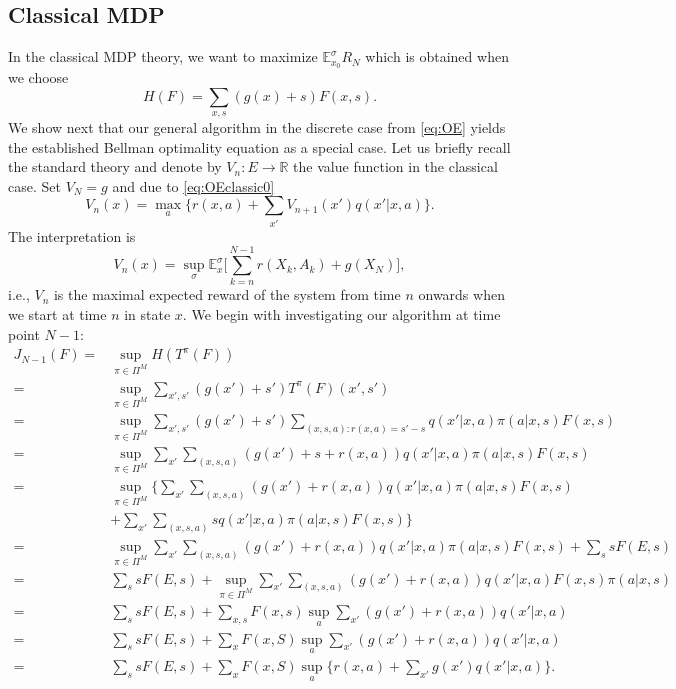 \documentclass[reqno, 12pt]{amsart}%
\newcommand{\R}{\mathbb{R}} %
\newcommand{\EE}{\mathbb{E}}
\theoremstyle{definition}
\numberwithin{equation}{section} \numberwithin{theorem}{section}
\begin{document}
\subsection{Classical MDP}
In the classical MDP theory, we want to maximize $\EE_{x_0}^\sigma R_N$ which is obtained when we choose $$H(F)=\sum_{x,s} (g(x)+s) F(x,s).$$
We show next that our general algorithm in the discrete case from \eqref{eq:OE} yields the established Bellman optimality equation as a special case. Let us briefly recall the standard theory and denote by $V_n : E\to \R$ the value function in the classical case.  Set $V_N=g$ and due to \eqref{eq:OEclassic0}
\begin{equation}\label{eq:OEclassic}
    V_n(x)= \max_a \big\{r(x,a) + \sum_{x'} 
    V_{n+1}(x')q(x'|x,a) \big\}.
\end{equation} 
The interpretation is 
$$V_n(x) = \sup_\sigma \EE_x^\sigma\Big[\sum_{k=n}^{N-1}r(X_k,A_k) + g(X_N)\Big],$$
i.e., $V_n$ is the maximal expected reward of 
the system from time $n$ onwards when we start 
at time $n$ in state $x.$ We begin with 
investigating our algorithm at time point 
$N-1:$
 \begin{align*}
J_{N-1}(F)  =& \sup_{\pi\in \Pi^M} H(T^\pi(F)) 
\\
 =& \sup_{\pi\in \Pi^M}  \sum_{x',s'} (g(x')+s') T^\pi(F)(x',s')\\
 =& \sup_{\pi\in \Pi^M}  \sum_{x',s'} 
 (g(x')+s')  \sum_{(x,s,a) :  r(x,a)=s'-s}  q(x'|x,a) \pi(a|x,s) F(x,s)\\
 =& \sup_{\pi\in \Pi^M}  \sum_{x'}  \sum_{(x,s,a) }  (g(x')+s+r(x,a)) q(x'|x,a) \pi(a|x,s) F(x,s)\\
   =& \sup_{\pi\in \Pi^M}\Big\{  \sum_{x'}  \sum_{(x,s,a) }  (g(x')+r(x,a))  q(x'|x,a) \pi(a|x,s) F(x,s) \\
   & +  \sum_{x'}   \sum_{(x,s,a) } s q(x'|x,a) \pi(a|x,s) F(x,s) \Big\}\\
    =&\sup_{\pi\in \Pi^M}  \sum_{x'}  \sum_{(x,s,a) }  (g(x')+r(x,a))  q(x'|x,a) \pi(a|x,s) F(x,s) +    \sum_{s } s  F(E,s)\\
    =& \sum_{s } s  F(E,s) +\sup_{\pi\in \Pi^M}  \sum_{x'}  \sum_{(x,s,a) }  (g(x')+r(x,a))  q(x'|x,a) F(x,s) \pi(a|x,s)    \\
     =& \sum_{s } s  F(E,s) +\sum_{x,s}F(x,s)\sup_{a}  \sum_{x'} (g(x')+r(x,a))  q(x'|x,a)     \\
 =&\sum_{s } s  F(E,s) +  \sum_{x}  
F(x,S)   \sup_{a} \sum_{x' }  (g(x')+r(x,a))  q(x'|x,a) \\
       =&\sum_{s } s  F(E,s) +  \sum_{x}  F(x,S)   \sup_{a} \{r(x,a)+\sum_{x' }  g(x')  q(x'|x,a)\}. 
 \end{align*}  
\end{document}

